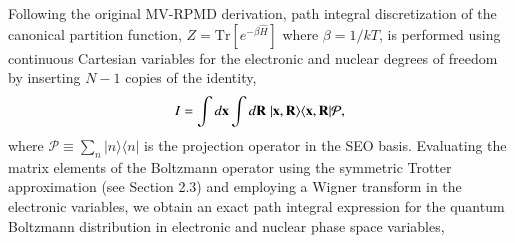 \documentclass[phd,tocprelim]{cornell}
\begin{document}
Following the original MV-RPMD derivation,
path integral discretization of the canonical
partition function, 
$Z=\textrm{Tr}\left[ e^{-\beta \hat H} \right]$
where $\beta=1/kT$, is performed using continuous Cartesian
variables for the electronic and nuclear degrees 
of freedom by inserting $N-1$ copies of the identity,
\begin{equation} \label{eq:identity} 
I = \int d {\bf{x}}\int d{\bf{R}} \;
|{\bf{x}},{\bf{R}} \rangle
\langle {\bf{x}},{\bf R} | \mathcal{P},
\end{equation}
where $\mathcal{P}\equiv \sum_n|n\rangle\langle n|$ is the
projection operator in the SEO basis.
Evaluating the matrix elements of the
Boltzmann operator using the symmetric 
Trotter approximation (see Section 2.3)
and employing a Wigner transform
in the electronic variables, 
we obtain an exact path integral 
expression for the quantum Boltzmann distribution 
in electronic and nuclear phase space variables,
\end{document}
